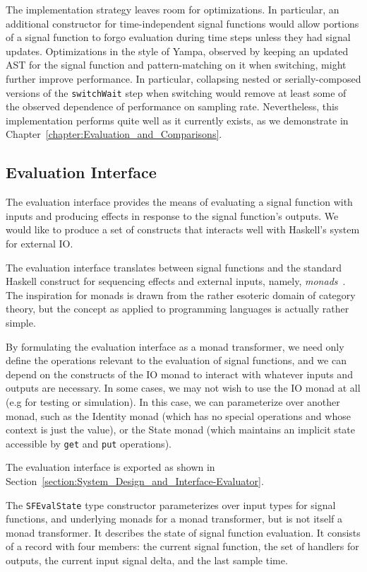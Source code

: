 The implementation strategy leaves room for optimizations. In particular, an
additional constructor for time-independent signal functions would allow
portions of a signal function to forgo evaluation during time steps unless they
had signal updates. Optimizations in the style of Yampa, observed by keeping
an updated AST for the signal function and pattern-matching on it when switching,
might further improve performance. In particular, collapsing nested or
serially-composed versions of the {\tt switchWait} step when switching would
remove at least some of the observed dependence of performance on sampling rate.
Nevertheless, this implementation performs quite well as it currently exists, as
we demonstrate in Chapter~\ref{chapter:Evaluation_and_Comparisons}.

\subsection{Evaluation Interface}
\label{subsection:Implementation-Evaluation_Interface}
The evaluation interface provides the means of evaluating a signal function
with inputs and producing effects in response to the signal function's outputs.
We would like to produce a set of constructs that interacts well with Haskell's
system for external IO.

The evaluation interface translates between signal functions and the standard
Haskell construct for sequencing effects and external inputs, namely,
{\em monads}~\cite{PeytonJones1993}. The inspiration for monads is drawn from
the rather esoteric domain of category theory, but the concept as applied to
programming languages is actually rather simple.

By formulating
the evaluation interface as a monad transformer, we need only define the
operations relevant to the evaluation of signal functions, and we can depend
on the constructs of the IO monad to interact with whatever inputs and outputs
are necessary. In some cases, we may not wish to use the IO monad at all (e.g
for testing or simulation). In this case, we can parameterize over another
monad, such as the Identity monad (which has no special operations and whose
context is just the value), or the State monad (which maintains an implicit 
state accessible by {\tt get} and {\tt put} operations).

The evaluation interface is exported as shown in
Section~\ref{section:System_Design_and_Interface-Evaluator}.

The {\tt SFEvalState} type constructor parameterizes over input types for signal
functions, and underlying monads for a monad transformer, but is not itself
a monad transformer. It describes the state of signal function evaluation.
It consists of a record with four members: the current signal function,
the set of handlers for outputs, the current input signal delta, and the last
sample time.

